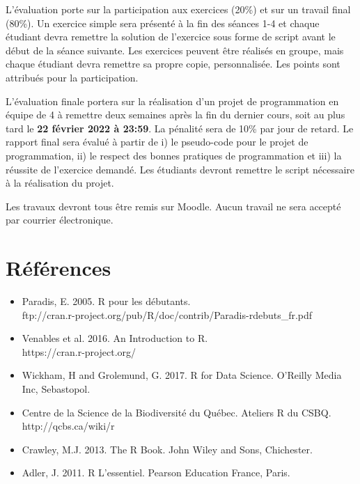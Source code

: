\documentclass[12]{article}
\begin{document}
	L'évaluation porte sur la participation aux exercices (20\%) et sur un
	travail final (80\%). Un exercice simple sera présenté à la fin des
	séances 1-4 et chaque étudiant devra remettre la solution de l'exercice sous
	forme de script avant le début de la séance suivante. Les exercices
	peuvent être réalisés en groupe, mais chaque étudiant devra remettre sa
	propre copie, personnalisée. Les points sont attribués pour la
	participation.

	L'évaluation finale portera sur la réalisation d'un projet de
	programmation en équipe de 4 à remettre deux semaines après la fin du
	dernier cours, soit au plus tard le \textbf{22 février 2022 à 23:59}. La
	pénalité sera de 10\% par jour de retard. Le rapport final sera évalué à
	partir de i) le pseudo-code pour le projet de programmation, ii) le
	respect des bonnes pratiques de programmation et iii) la réussite de
	l'exercice demandé. Les étudiants devront remettre le script nécessaire à
	la réalisation du projet.

	Les travaux devront tous être remis sur Moodle. Aucun travail ne sera accepté par courrier électronique.

	\section*{Références}

	\begin{itemize}
	\renewcommand{\labelitemi}{$\bullet$}

		\item Paradis, E. 2005. R pour les débutants.
		\\ ftp://cran.r-project.org/pub/R/doc/contrib/Paradis-rdebuts\_fr.pdf

		\item Venables et al. 2016. An Introduction to R.
		\\ https://cran.r-project.org/

		\item Wickham, H and Grolemund, G. 2017. R for Data Science. O'Reilly Media Inc, Sebastopol.

		\item Centre de la Science de la Biodiversité du Québec. Ateliers R du CSBQ. \\ http://qcbs.ca/wiki/r

		\item Crawley, M.J. 2013. The R Book. John Wiley and Sons, Chichester.

		\item Adler, J. 2011. R L'essentiel. Pearson Education France, Paris.

	\end{itemize}
\end{document}
